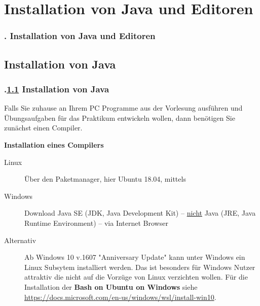 \AtBeginSection{}
\section{Installation von Java und Editoren}
\begin{frame}
  \frametitle{\kap. Installation von Java und Editoren}%
\tableofcontents[current]
\end{frame}


\def\stitle{Installation von Java}%
\subsection{\stitle}\label{S:Compiler}
\begin{frame}[t]%
  \frametitle{\kap.\ref{S:Compiler} \stitle}%
\medskip

Falls Sie zuhause an Ihrem PC Programme aus der Vorlesung ausf\"uhren und \"Ubungsaufgaben f\"ur das Praktikum entwickeln wollen, dann ben\"otigen Sie zun\"achst einen Compiler.
\medskip

\textbf{Installation eines Compilers}
\begin{description}
  \item [Linux] \"Uber den Paketmanager, hier Ubuntu 18.04, mittels \\
  \item[Windows] Download Java SE (JDK, Java Development Kit) -- \underline{nicht} Java (JRE, Java Runtime Environment) -- via Internet Browser
  \item[Alternativ] Ab Windows 10 v.1607 "{}Anniversary Update"{} kann unter Windows ein Linux Subsytem installiert werden.
    Das ist besonders f\"ur Windows Nutzer attraktiv die nicht auf die Vorz\"uge von Linux verzichten wollen.
    F\"ur die Installation der \textbf{Bash on Ubuntu on Windows} siehe \textcolor{KITblue}{\url{https://docs.microsoft.com/en-us/windows/wsl/install-win10}}.
\end{description}
\end{frame}


\def\stitle{Editoren}%

